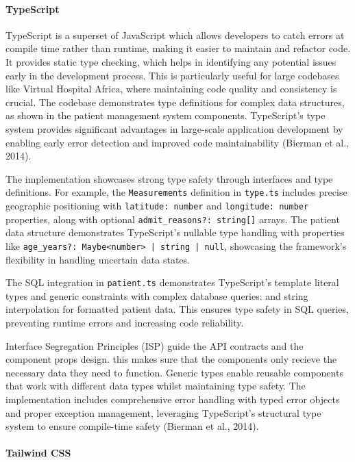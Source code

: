 \paragraph{TypeScript}\mbox{}

TypeScript is a superset of JavaScript which allows developers to catch errors at compile time rather than runtime, making it easier to maintain and refactor code. It provides static type checking, which helps in identifying any potential issues early in the development process. This is particularly useful for large codebases like Virtual Hospital Africa, where maintaining code quality and consistency is crucial. The codebase demonstrates type definitions for complex data structures, as shown in the patient management system components. TypeScript's type system provides significant advantages in large-scale application development by enabling early error detection and improved code maintainability (Bierman et al., 2014).

The implementation showcases strong type safety through interfaces and type definitions. For example, the \texttt{Measurements} definition in \texttt{type.ts} includes precise geographic positioning with \texttt{latitude: number} and \texttt{longitude: number} properties, along with optional \texttt{admit\_reasons?: string[]} arrays. The patient data structure demonstrates TypeScript's nullable type handling with properties like \texttt{age\_years?: Maybe<number> | string | null}, showcasing the framework's flexibility in handling uncertain data states.

The SQL integration in \texttt{patient.ts} demonstrates TypeScript's template literal types and generic constraints with complex database queries: \texttt{} and string interpolation for formatted patient data. This ensures type safety in SQL queries, preventing runtime errors and increasing code reliability.

Interface Segregation Principles (ISP) guide the API contracts and the component props  design. this makes sure that the components only recieve the necessary data they need to function. Generic types enable reusable components that work with different data types whilst maintaining type safety. The implementation includes comprehensive error handling with typed error objects and proper exception management, leveraging TypeScript's structural type system to ensure compile-time safety (Bierman et al., 2014).

\paragraph{Tailwind CSS}\mbox{}

